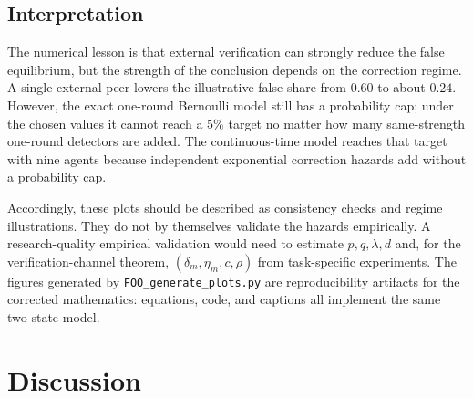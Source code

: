 \documentclass[12pt]{article}
\theoremstyle{definition}
\begin{document}
\subsection{Interpretation}
\label{sec:parameter-interpretation}

The numerical lesson is that external verification can strongly reduce the
false equilibrium, but the strength of the conclusion depends on the correction
regime.  A single external peer lowers the illustrative false share from
\(0.60\) to about \(0.24\).  However, the exact one-round Bernoulli model still
has a probability cap; under the chosen values it cannot reach a \(5\%\) target
no matter how many same-strength one-round detectors are added.  The
continuous-time model reaches that target with nine agents because independent
exponential correction hazards add without a probability cap.

Accordingly, these plots should be described as consistency checks and regime
illustrations.  They do not by themselves validate the hazards empirically.  A
research-quality empirical validation would need to estimate \(p,q,\lambda,d\)
and, for the verification-channel theorem, \((\delta_m,\eta_m,c,\rho)\) from
task-specific experiments.  The figures generated by
\texttt{FOO\_generate\_plots.py} are reproducibility artifacts for the corrected
mathematics: equations, code, and captions all implement the same two-state
model.


\section{Discussion}\label{sec:discussion}
\end{document}
